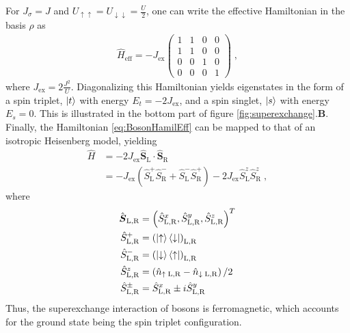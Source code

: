 For $J_{\sigma} = J $ and $U_{\uparrow\uparrow} = U_{\downarrow\downarrow} = \frac{U}{2}$, one can write the effective Hamiltonian in the basis $\rho$ as
\begin{align}
\hat{H}_{\mathrm{eff}} = -J_{\mathrm{ex}} \begin{pmatrix}
           1 & 1 & 0 & 0 \\
           1 & 1 & 0 & 0 \\
           0 & 0 & 1 & 0 \\
           0 & 0 & 0 & 1 
         \end{pmatrix} \; , \label{eq:BosonHamilEff}
\end{align}
where $J_{\mathrm{ex}} = 2 \frac{J^2}{U}$. Diagonalizing this Hamiltonian yields eigenstates in the form of a spin triplet, $\ket{t}$ with energy $E_t = -2 J_{\mathrm{ex}}$, and a spin singlet, $\ket{s}$ with energy $E_s = 0$. This is illustrated in the bottom part of figure \ref{fig:superexchange}.\textbf{B}.
Finally, the Hamiltonian \eqref{eq:BosonHamilEff} can be mapped to that of an isotropic Heisenberg model, yielding
\begin{align}
	\hat{H} &= -2 J_{\mathrm{ex}} \hat{\boldsymbol{S}}_{\mathrm{L}} \cdot \hat{\boldsymbol{S}}_{\mathrm{R}} \nonumber \\
	&= - J_{\mathrm{ex}} \left( \hat{S}_{\mathrm{L}}^{+} \hat{S}_{\mathrm{R}}^{-} + \hat{S}_{\mathrm{L}}^{-} \hat{S}_{\mathrm{R}}^{+} \right) - 2 J_{\mathrm{ex}} \hat{S}_{\mathrm{L}}^{z} \hat{S}_{\mathrm{R}}^{z} \; , \label{eq:twositeFerro}
\end{align}
where 
\begin{align*}
\hat{\boldsymbol{S}}_{\mathrm{L,R}} &= \left(  \hat{S}_{\mathrm{L,R}}^{x} , \hat{S}_{\mathrm{L,R}}^{y} , \hat{S}_{\mathrm{L,R}}^{z} \right)^{T} \\
\hat{S}_{\mathrm{L},\mathrm{R}}^{+} &= \left( \ket{\uparrow}\bra{\downarrow} \right)_{\mathrm{L},\mathrm{R}} \\
\hat{S}_{\mathrm{L},\mathrm{R}}^{-} &= \left( \ket{\downarrow}\bra{\uparrow} \right)_{\mathrm{L},\mathrm{R}} \\
\hat{S}_{\mathrm{L},\mathrm{R}}^{z} &= \left( \hat{n}_{\uparrow \; \mathrm{L},\mathrm{R}} - \hat{n}_{\downarrow \; \mathrm{L},\mathrm{R}} \right)/2 \\
\hat{S}_{\mathrm{L},\mathrm{R}}^{\pm} &= \hat{S}_{\mathrm{L},\mathrm{R}}^{x} \pm i \hat{S}_{\mathrm{L},\mathrm{R}}^{y}
\end{align*}
Thus, the superexchange interaction of bosons is ferromagnetic, which accounts for the ground state being the spin triplet configuration.


